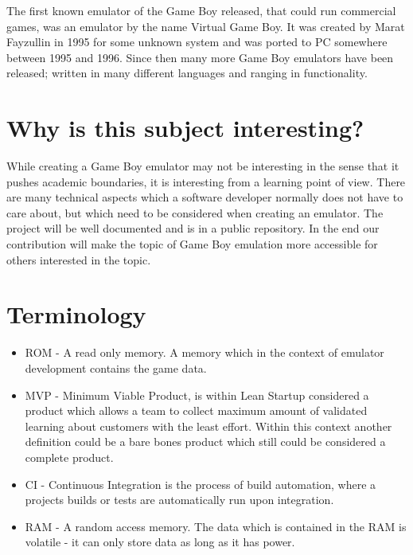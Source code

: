 The first known emulator of the Game Boy released, that could run commercial games, was an emulator by the name Virtual Game Boy. It was created by Marat Fayzullin in 1995 for some unknown system and was ported to PC somewhere between 1995 and 1996\cite{gameboyemulationhistory}. Since then many more Game Boy emulators have been released; written in many different languages and ranging in functionality\cite{gameboyemulators}.

\section{Why is this subject interesting?}
While creating a Game Boy emulator may not be interesting in the sense that it pushes academic boundaries, it is interesting from a learning point of view. There are many technical aspects which a software developer normally does not have to care about, but which need to be considered when creating an emulator. The project will be well documented and is in a public repository. In the end our contribution will make the topic of Game Boy emulation more accessible for others interested in the topic.

\section{Terminology}

\begin{itemize}
    \item ROM - A read only memory. A memory which in the context of emulator development contains the game data.
    \item MVP - Minimum Viable Product, is within Lean Startup considered a product which allows a team to collect maximum amount of validated learning about customers with the least effort\cite{Lean}. Within this context another definition could be a bare bones product which still could be considered a complete product. 
    \item CI - Continuous Integration is the process of build automation, where a projects builds or tests are automatically run upon integration\cite{CI}.
    \item RAM - A random access memory. The data which is contained in the RAM is volatile - it can only store data as long as it has power.
    
\end{itemize}